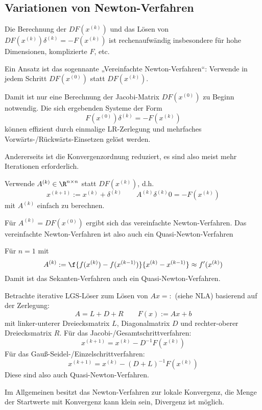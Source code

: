 \documentclass[11pt]{scrartcl}
\begin{document}
\subsection{Variationen von Newton-Verfahren}

Die Berechnung der $DF(x^{(k)})$ und das Lösen von $DF(x^{(k)}) \delta^{(k)} = -F(x^{(k)})$ ist rechenaufwändig insbesondere für hohe Dimensionen, komplizierte $F$, etc.

\begin{seg}
	Ein Ansatz ist das sogennante „Vereinfachte Newton-Verfahren“:
	Verwende in jedem Schritt $DF(x^{(0)})$ statt $DF(x^{(k)})$.

	Damit ist nur eine Berechnung der Jacobi-Matrix $DF(x^{(0)})$ zu Beginn notwendig.
	Die sich ergebenden Systeme der Form 
	\[
		F(x^{(0)}) \delta^{(k)} = -F(x^{(k)})
	\]
	können effizient durch einmalige LR-Zerlegung und mehrfaches Vorwärts-/Rückwärts-Einsetzen gelöst werden.

	Andererseits ist die Konvergenzordnung reduziert, es sind also meist mehr Iterationen erforderlich.
\end{seg}

\begin{seg}
	Verwende $A^{(k)} \in \R^{n\times n}$ statt $DF(x^{(k)})$, d.h.
	\[
		x^{(k+1)} := x^{(k)} + \delta^{(k)}
		\qquad A^{(k)} \delta^{(k)}0= -F(x^{(k)})
	\]
	mit $A^{(k)}$ einfach zu berechnen.

	Für $A^{(k)} = DF(x^{(0)})$ ergibt sich das vereinfachte Newton-Verfahren.
	Das vereinfachte Newton-Verfahren ist also auch ein Quasi-Newton-Verfahren

	Für $n=1$ mit
	\[
		A^{(k)} := \f {f(x^{(k)}) - f(x^{(k-1)})}{x^{(k)} - x^{(k-1)}} \approx f'(x^{(k)})
	\]
	Damit ist das Sekanten-Verfahren auch ein Quasi-Newton-Verfahren.

	Betrachte iterative LGS-Löser zum Lösen von $Ax=:$ (siehe NLA) basierend auf der Zerlegung:
	\[
		A = L + D + R 
		\qquad F(x) := Ax + b
	\]
	mit linker-unterer Dreiecksmatrix $L$, Diagonalmatrix $D$ und rechter-oberer Dreiecksmatrix $R$.
	Für das Jacobi-/Gesamtschrittverfahren:
	\[
		x^{(k+1)} = x^{(k)} - D^{-1} F(x^{(k)})
	\]
	Für das Gauß-Seidel-/Einzelschrittverfahren:
	\[
		x^{(k+1)} = x^{(k)} - (D+L)^{-1} F(x^{(k)})
	\]
	Diese sind also auch Quasi-Newton-Verfahren.
\end{seg}

Im Allgemeinen besitzt das Newton-Verfahren zur lokale Konvergenz, die Menge der Startwerte mit Konvergenz kann klein sein, Divergenz ist möglich.
\end{document}
